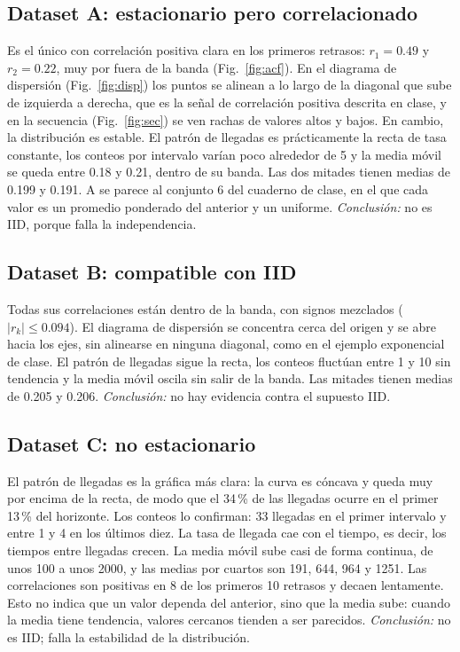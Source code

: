 \documentclass[conference]{IEEEtran}
\begin{document}
\subsection{Dataset A: estacionario pero correlacionado}
Es el único con correlación positiva clara en los primeros retrasos: $r_1=0.49$ y $r_2=0.22$, muy por fuera de la banda (Fig.~\ref{fig:acf}). En el diagrama de dispersión (Fig.~\ref{fig:disp}) los puntos se alinean a lo largo de la diagonal que sube de izquierda a derecha, que es la señal de correlación positiva descrita en clase, y en la secuencia (Fig.~\ref{fig:sec}) se ven rachas de valores altos y bajos. En cambio, la distribución es estable. El patrón de llegadas es prácticamente la recta de tasa constante, los conteos por intervalo varían poco alrededor de 5 y la media móvil se queda entre 0.18 y 0.21, dentro de su banda. Las dos mitades tienen medias de 0.199 y 0.191. A se parece al conjunto 6 del cuaderno de clase, en el que cada valor es un promedio ponderado del anterior y un uniforme. \emph{Conclusión:} no es IID, porque falla la independencia.

\subsection{Dataset B: compatible con IID}
Todas sus correlaciones están dentro de la banda, con signos mezclados ($|r_k|\le0.094$). El diagrama de dispersión se concentra cerca del origen y se abre hacia los ejes, sin alinearse en ninguna diagonal, como en el ejemplo exponencial de clase. El patrón de llegadas sigue la recta, los conteos fluctúan entre 1 y 10 sin tendencia y la media móvil oscila sin salir de la banda. Las mitades tienen medias de 0.205 y 0.206. \emph{Conclusión:} no hay evidencia contra el supuesto IID.

\subsection{Dataset C: no estacionario}
El patrón de llegadas es la gráfica más clara: la curva es cóncava y queda muy por encima de la recta, de modo que el 34\,\% de las llegadas ocurre en el primer 13\,\% del horizonte. Los conteos lo confirman: 33 llegadas en el primer intervalo y entre 1 y 4 en los últimos diez. La tasa de llegada cae con el tiempo, es decir, los tiempos entre llegadas crecen. La media móvil sube casi de forma continua, de unos 100 a unos 2000, y las medias por cuartos son 191, 644, 964 y 1251. Las correlaciones son positivas en 8 de los primeros 10 retrasos y decaen lentamente. Esto no indica que un valor dependa del anterior, sino que la media sube: cuando la media tiene tendencia, valores cercanos tienden a ser parecidos. \emph{Conclusión:} no es IID; falla la estabilidad de la distribución.
\end{document}
